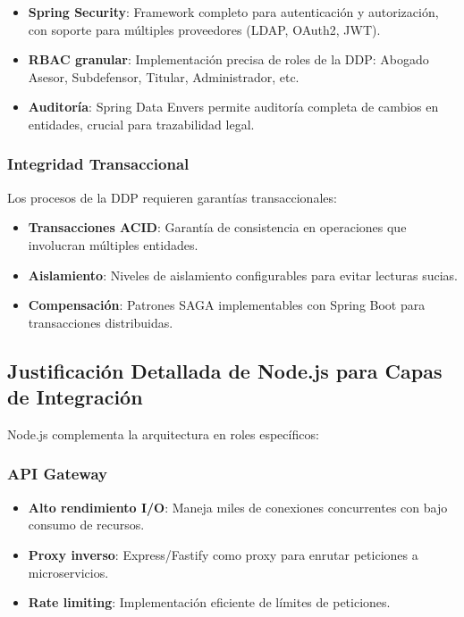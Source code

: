 \begin{itemize}
    \item \textbf{Spring Security}: Framework completo para autenticación y autorización, con soporte para múltiples proveedores (LDAP, OAuth2, JWT).
    \item \textbf{RBAC granular}: Implementación precisa de roles de la DDP: Abogado Asesor, Subdefensor, Titular, Administrador, etc.
    \item \textbf{Auditoría}: Spring Data Envers permite auditoría completa de cambios en entidades, crucial para trazabilidad legal.
\end{itemize}

\subsubsection{Integridad Transaccional}

Los procesos de la DDP requieren garantías transaccionales:

\begin{itemize}
    \item \textbf{Transacciones ACID}: Garantía de consistencia en operaciones que involucran múltiples entidades.
    \item \textbf{Aislamiento}: Niveles de aislamiento configurables para evitar lecturas sucias.
    \item \textbf{Compensación}: Patrones SAGA implementables con Spring Boot para transacciones distribuidas.
\end{itemize}

\subsection{Justificación Detallada de Node.js para Capas de Integración}

Node.js complementa la arquitectura en roles específicos:

\subsubsection{API Gateway}

\begin{itemize}
    \item \textbf{Alto rendimiento I/O}: Maneja miles de conexiones concurrentes con bajo consumo de recursos.
    \item \textbf{Proxy inverso}: Express/Fastify como proxy para enrutar peticiones a microservicios.
    \item \textbf{Rate limiting}: Implementación eficiente de límites de peticiones.
\end{itemize}

